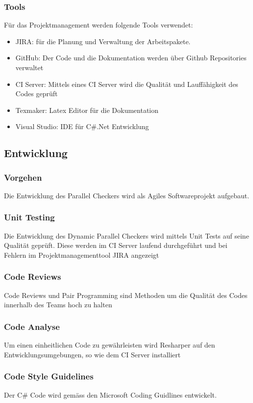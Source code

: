 \documentclass[10pt,a4paper]{article}
\begin{document}
\subsubsection{Tools}
Für das Projektmanagement werden folgende Tools verwendet:
\begin{itemize}
\item JIRA: für die Planung und Verwaltung der Arbeitspakete.
\item GitHub: Der Code und die Dokumentation werden über Github Repositories verwaltet
\item CI Server: Mittels eines CI Server wird die Qualität und Lauffähigkeit des Codes geprüft
\item Texmaker: Latex Editor für die Dokumentation
\item Visual Studio: IDE für C\#.Net Entwicklung
\end{itemize}
\subsection{Entwicklung}
\subsubsection{Vorgehen}
Die Entwicklung des Parallel Checkers wird als Agiles Softwareprojekt aufgebaut.
\subsubsection{Unit Testing}
Die Entwicklung des Dynamic Parallel Checkers wird mittels Unit Tests auf seine Qualität geprüft. Diese werden im CI Server laufend durchgeführt und bei Fehlern im Projektmanagementtool JIRA angezeigt
\subsubsection{Code Reviews}
Code Reviews und Pair Programming sind Methoden um die Qualität des Codes innerhalb des Teams hoch zu halten
\subsubsection{Code Analyse}
Um einen einheitlichen Code zu gewährleisten wird Resharper auf den Entwicklungsumgebungen, so wie dem CI Server installiert
\subsubsection{Code Style Guidelines}
Der C\# Code wird gemäss den Microsoft Coding Guidlines entwickelt.
\end{document}
